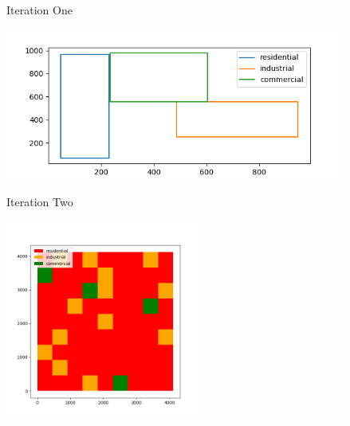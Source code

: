 \documentclass[10pt, aspectratio=169]{beamer}
\begin{document}
    \begin{frame}[fragile]{Iteration One}
        \begin{center}
            \includegraphics[height=5cm, keepaspectratio]{images/first-zoning.png}
        \end{center}
    \end{frame}
    
    \begin{frame}[fragile]{Iteration Two}
        \begin{center}
            \includegraphics[height=6.6cm, keepaspectratio]{images/secondzoning.png}
        \end{center}
    \end{frame}
    
\end{document}
